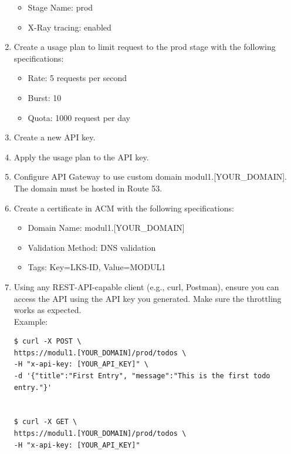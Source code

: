 \documentclass{article}
\begin{document}
\begin{enumerate}
\begin{itemize}
    \item Stage Name: prod
    \item X-Ray tracing: enabled
\end{itemize}
\item Create a usage plan to limit request to the prod stage with the following specifications:
\begin{itemize}
    \item Rate: 5 requests per second
    \item Burst: 10
    \item Quota: 1000 request per day
\end{itemize}
\item Create a new API key.
\item Apply the usage plan to the API key.
\item Configure API Gateway to use custom domain modul1.[YOUR\_DOMAIN]. The domain must be hosted in Route 53.
\item Create a certificate in ACM with the following specifications:
\begin{itemize}
    \item Domain Name: modul1.[YOUR\_DOMAIN]
    \item Validation Method: DNS validation
    \item Tags: Key=LKS-ID, Value=MODUL1
\end{itemize}
\item Using any REST-API-capable client (e.g., curl, Postman), ensure you can access the API using the API key you generated. Make sure the throttling works as expected.\\
Example: 
\begin{lstlisting}[style=bashStyle]
$ curl -X POST \
https://modul1.[YOUR_DOMAIN]/prod/todos \
-H "x-api-key: [YOUR_API_KEY]" \
-d '{"title":"First Entry", "message":"This is the first todo entry."}'


$ curl -X GET \
https://modul1.[YOUR_DOMAIN]/prod/todos \
-H "x-api-key: [YOUR_API_KEY]"
\end{lstlisting}
\end{enumerate}
\end{document}
